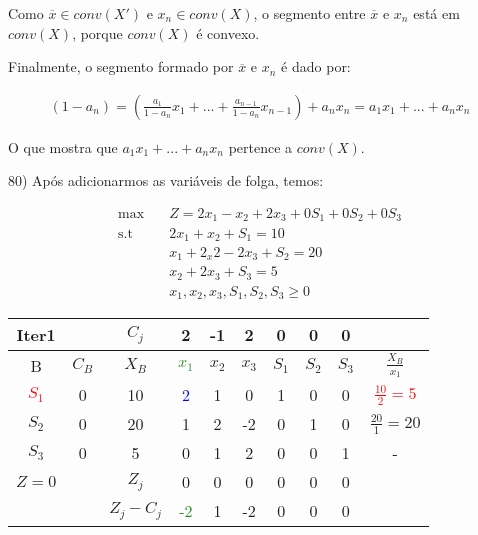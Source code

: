 \documentclass[]{article}
\begin{document}
Como $\overline{x} \in conv(X')$ e $x_n \in conv(X)$, o segmento entre $\overline{x}$ e $x_n$ está em $conv(X)$, porque $conv(X)$ é convexo.

Finalmente, o segmento formado por $\overline{x}$ e $x_n$ é dado por:

\begin{align*}
(1 - a_n) = (\frac{a_1}{1-a_n} x_1 + ... + \frac{a_{n-1}}{1-a_n} x_{n-1}) + a_n x_n = a_1 x_1 + ... + a_n x_n
\end{align*}

O que mostra que $a_1 x_1 + ... + a_n x_n$ pertence a $conv(X)$.

\vspace{0.5cm}

80) Após adicionarmos as variáveis de folga, temos:

\begin{align*}
    \max        &\quad Z = 2x_1 - x_2 + 2x_3 + 0S_1 + 0S_2 + 0S_3 \\
    \text{s.t}  &\quad 2x_1 + x_2 + S_1 = 10 \\
                &\quad x_1 + 2_x2 - 2x_3 + S_2 = 20 \\
                &\quad x_2 + 2x_3 + S_3 = 5 \\
                &\quad x_1, x_2, x_3, S_1, S_2, S_3 \geq 0
\end{align*}

\begin{center}
 \begin{tabular}{| c | c | c | c | c | c | c | c | c | c |} 
 \hline
 Iter1 &   & $C_j$ & 2 & -1 & 2 & 0 & 0 & 0 &  \\ [0.5ex] 
 \hline
 B & $C_B$ & $X_B$ & \textcolor{ForestGreen}{$x_1$} & $x_2$ & $x_3$ & $S_1$ & $S_2$ & $S_3$ & $\frac{X_B}{x_1}$ \\ 
 \hline
 \textcolor{red}{$S_1$} & 0 & 10 & \textcolor{blue}{2} & 1 & 0 & 1 & 0 & 0 & \textcolor{red}{$\frac{10}{2}=5$} \\
 \hline
 $S_2$ & 0 & 20 & 1 & 2 & -2 & 0 & 1 & 0 & $\frac{20}{1}=20$ \\
 \hline
 $S_3$ & 0 & 5 & 0 & 1 & 2 & 0 & 0 & 1 & - \\
 \hline
 $Z=0$ &   & $Z_j$ & 0 & 0 & 0 & 0 & 0 & 0 &   \\
 \hline
  &   & $Z_j - C_j$ & \textcolor{ForestGreen}{-2} & 1 & -2 & 0 & 0 & 0 &   \\
 \hline
\end{tabular}
\end{center}
\end{document}
